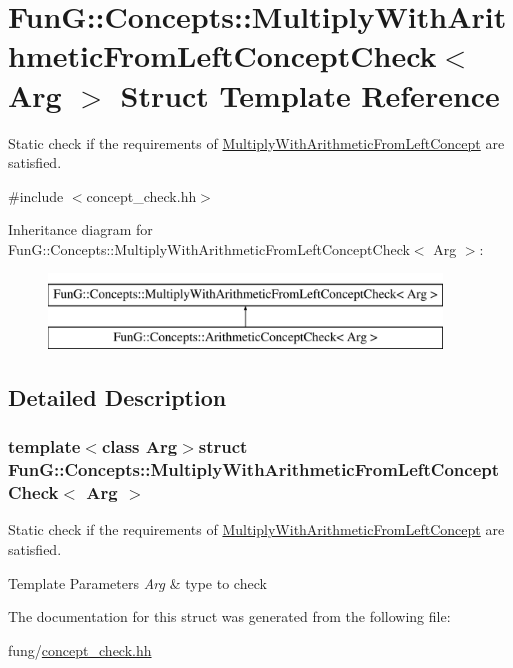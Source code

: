 \hypertarget{structFunG_1_1Concepts_1_1MultiplyWithArithmeticFromLeftConceptCheck}{}\section{Fun\+G\+:\+:Concepts\+:\+:Multiply\+With\+Arithmetic\+From\+Left\+Concept\+Check$<$ Arg $>$ Struct Template Reference}
\label{structFunG_1_1Concepts_1_1MultiplyWithArithmeticFromLeftConceptCheck}


Static check if the requirements of \hyperlink{structFunG_1_1Concepts_1_1MultiplyWithArithmeticFromLeftConcept}{Multiply\+With\+Arithmetic\+From\+Left\+Concept} are satisfied.  




{\ttfamily \#include $<$concept\+\_\+check.\+hh$>$}

Inheritance diagram for Fun\+G\+:\+:Concepts\+:\+:Multiply\+With\+Arithmetic\+From\+Left\+Concept\+Check$<$ Arg $>$\+:\begin{figure}[H]
\begin{center}
\leavevmode
\includegraphics[height=2.000000cm]{structFunG_1_1Concepts_1_1MultiplyWithArithmeticFromLeftConceptCheck}
\end{center}
\end{figure}


\subsection{Detailed Description}
\subsubsection*{template$<$class Arg$>$struct Fun\+G\+::\+Concepts\+::\+Multiply\+With\+Arithmetic\+From\+Left\+Concept\+Check$<$ Arg $>$}

Static check if the requirements of \hyperlink{structFunG_1_1Concepts_1_1MultiplyWithArithmeticFromLeftConcept}{Multiply\+With\+Arithmetic\+From\+Left\+Concept} are satisfied. 


\begin{DoxyTemplParams}{Template Parameters}
{\em Arg} & type to check \\
\hline
\end{DoxyTemplParams}


The documentation for this struct was generated from the following file\+:\begin{DoxyCompactItemize}
\item 
fung/\hyperlink{concept__check_8hh}{concept\+\_\+check.\+hh}\end{DoxyCompactItemize}
